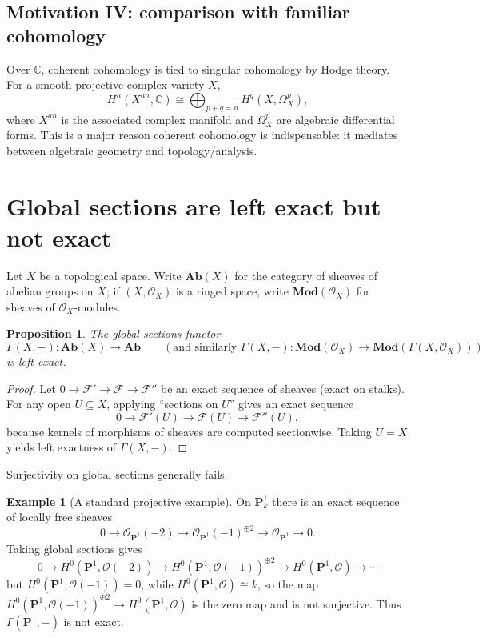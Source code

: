 \documentclass[11pt]{article}
\theoremstyle{definition}
\newtheorem{example}[definition]{Example}
\theoremstyle{plain}
\newtheorem{proposition}[definition]{Proposition}
\newcommand{\Ab}{\mathbf{Ab}}
\newcommand{\Mod}{\mathbf{Mod}}
\newcommand{\OO}{\mathcal{O}}
\newcommand{\PP}{\mathbf{P}}
\begin{document}
\subsection{Motivation IV: comparison with familiar cohomology}

Over $\mathbb{C}$, coherent cohomology is tied to singular cohomology by Hodge theory. For a smooth projective complex variety $X$,
\[
H^n(X^{an},\mathbb{C}) \cong \bigoplus_{p+q=n} H^q(X,\Omega_X^p),
\]
where $X^{an}$ is the associated complex manifold and $\Omega_X^p$ are algebraic differential forms. This is a major reason coherent cohomology is indispensable: it mediates between algebraic geometry and topology/analysis.

\section{Global sections are left exact but not exact}

Let $X$ be a topological space. Write $\Ab(X)$ for the category of sheaves of abelian groups on $X$; if $(X,\OO_X)$ is a ringed space, write $\Mod(\OO_X)$ for sheaves of $\OO_X$-modules.

\begin{proposition}\label{prop:Gamma-left-exact}
The global sections functor
\[
\Gamma(X,-):\Ab(X)\to \Ab\qquad (\text{and similarly } \Gamma(X,-):\Mod(\OO_X)\to \Mod(\Gamma(X,\OO_X)))
\]
is left exact.
\end{proposition}

\begin{proof}
Let $0\to \mathcal{F}'\to \mathcal{F}\to \mathcal{F}''$ be an exact sequence of sheaves (exact on stalks).
For any open $U\subseteq X$, applying ``sections on $U$'' gives an exact sequence
\[
0\to \mathcal{F}'(U)\to \mathcal{F}(U)\to \mathcal{F}''(U),
\]
because kernels of morphisms of sheaves are computed sectionwise. Taking $U=X$ yields left exactness of $\Gamma(X,-)$.
\end{proof}

Surjectivity on global sections generally fails.

\begin{example}[A standard projective example]\label{ex:Gamma-not-exact}
On $\PP^1_k$ there is an exact sequence of locally free sheaves
\[
0\longrightarrow \OO_{\PP^1}(-2)\longrightarrow \OO_{\PP^1}(-1)^{\oplus 2}\longrightarrow \OO_{\PP^1}\longrightarrow 0.
\]
Taking global sections gives
\[
0\longrightarrow H^0(\PP^1,\OO(-2))\longrightarrow H^0(\PP^1,\OO(-1))^{\oplus 2}\longrightarrow H^0(\PP^1,\OO)\longrightarrow \cdots
\]
but $H^0(\PP^1,\OO(-1))=0$, while $H^0(\PP^1,\OO)\cong k$, so the map
$H^0(\PP^1,\OO(-1))^{\oplus 2}\to H^0(\PP^1,\OO)$ is the zero map and is not surjective. Thus $\Gamma(\PP^1,-)$ is not exact.
\end{example}
\end{document}
